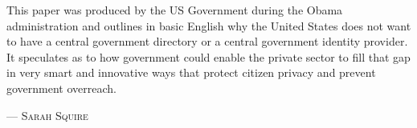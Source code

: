 This paper was produced by the US Government during the Obama administration and outlines in basic English why the United States does not want to have a central government directory or a central government identity provider. It speculates as to how government could enable the private sector to fill that gap in very smart and innovative ways that protect citizen privacy and prevent government overreach. 
\setlength{\parindent}{0cm}\par\textsc{ --- Sarah Squire }\par\vspace{12pt}\setlength{\parindent}{15pt}
